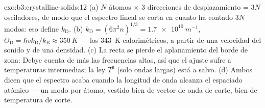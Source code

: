 \begin{solution}{exo:b3:crystalline-solids:12}
(a) $N$ átomos $\times$ 3 direcciones de desplazamiento = $3N$
osciladores, de modo que el espectro lineal se corta en cuanto ha
contado $3N$ modos: eso define $k_{\text{D}}$. (b)
$k_{\text{D}} = (6\pi^2n)^{1/3} = \qty{1.7e10}{m^{-1}}$,
$\Theta_{\text{D}} = \hbar vk_{\text{D}}/k_{\text{B}} \approx
\qty{350}{K}$ --- los \qty{343}{K} calorimétricos, a partir de una velocidad
del sonido y de una densidad. (c) La recta se pierde el aplanamiento
del borde de zona: Debye cuenta de más las frecuencias altas, así que el ajuste
sufre a temperaturas intermedias; la ley $T^3$ (solo ondas largas)
está a salvo. (d) Ambos dicen que el espectro acaba cuando la longitud de onda
alcanza el espaciado atómico --- un modo por átomo, vestido bien
de vector de onda de corte, bien de temperatura de corte.
\end{solution}

